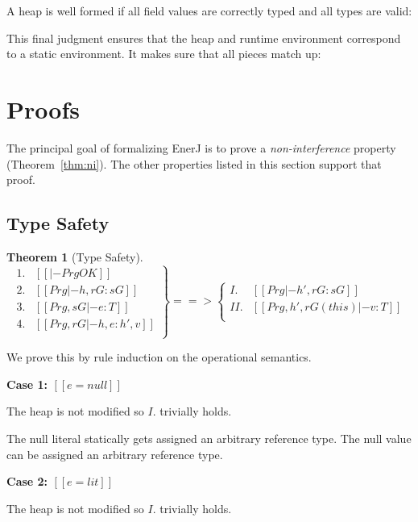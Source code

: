 \documentclass[final,10pt,twoside]{article}
\newtheorem{theorem}[definition]{Theorem}
\newcommand\proofcase[1]{\vspace{4mm plus 1mm minus 1mm}\noindent\textbf{#1}}
\begin{document}
A heap is well formed if all field values are correctly typed and all
types are valid:

\ottdefnwfheap


This final judgment ensures that the heap and runtime environment
correspond to a static environment.
It makes sure that all pieces match up:

\ottdefnwfenvs



\section{Proofs}
\label{proofs}

The principal goal of formalizing EnerJ is to prove a \emph{non-interference}
property (Theorem~\ref{thm:ni}). The other properties listed in this section
support that proof.


\subsection{Type Safety}

\begin{theorem}[Type Safety]
\label{thm:ts}
\[
\left.
\begin{array}{ll}
1. & [[|- Prg OK]]\\
2. & [[Prg |- h, rG : sG]]\\
3. & [[Prg, sG |- e : T]]\\
4. & [[Prg, rG |- h, e : h', v]]\\
\end{array}
\right\} ==> \left\{
\begin{array}{ll}
I.  & [[Prg |- h', rG : sG]]\\
II. & [[Prg, h', rG(this) |- v : T]]\\
\end{array}
\right.
\]
\end{theorem}


We prove this by rule induction on the operational semantics.

\proofcase{Case 1: $[[e = null]]$}

The heap is not modified so $I.$ trivially holds.

The null literal statically gets assigned an arbitrary reference type.
The null value can be assigned an arbitrary reference type.


\proofcase{Case 2: $[[e = lit]]$}

The heap is not modified so $I.$ trivially holds.
\end{document}
